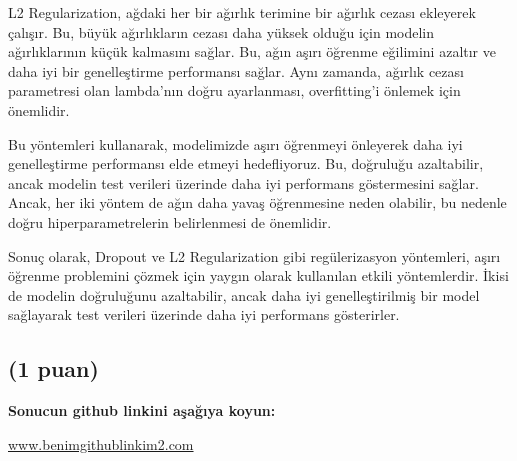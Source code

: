 \documentclass[11pt]{article}
\begin{document}
L2 Regularization, ağdaki her bir ağırlık terimine bir ağırlık cezası ekleyerek çalışır. Bu, büyük ağırlıkların cezası daha yüksek olduğu için modelin ağırlıklarının küçük kalmasını sağlar. Bu, ağın aşırı öğrenme eğilimini azaltır ve daha iyi bir genelleştirme performansı sağlar. Aynı zamanda, ağırlık cezası parametresi olan lambda'nın doğru ayarlanması, overfitting'i önlemek için önemlidir.

Bu yöntemleri kullanarak, modelimizde aşırı öğrenmeyi önleyerek daha iyi genelleştirme performansı elde etmeyi hedefliyoruz. Bu, doğruluğu azaltabilir, ancak modelin test verileri üzerinde daha iyi performans göstermesini sağlar. Ancak, her iki yöntem de ağın daha yavaş öğrenmesine neden olabilir, bu nedenle doğru hiperparametrelerin belirlenmesi de önemlidir.

Sonuç olarak, Dropout ve L2 Regularization gibi regülerizasyon yöntemleri, aşırı öğrenme problemini çözmek için yaygın olarak kullanılan etkili yöntemlerdir. İkisi de modelin doğruluğunu azaltabilir, ancak daha iyi genelleştirilmiş bir model sağlayarak test verileri üzerinde daha iyi performans gösterirler.

\subsection{(1 puan)} \textbf{Sonucun github linkini  aşağıya koyun:}

\url{www.benimgithublinkim2.com}
\end{document}
